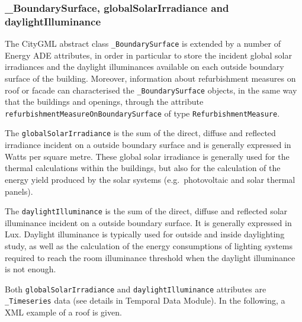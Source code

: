\documentclass[a4paper,12pt]{article}
\begin{document}
\subsubsection{\_BoundarySurface, globalSolarIrradiance and
daylightIlluminance}\label{boundarysurface-globalsolarirradiance-and-daylightilluminance}

The CityGML abstract class \texttt{\_BoundarySurface} is extended by a
number of Energy ADE attributes, in order in particular to store the
incident global solar irradiances and the daylight illuminances
available on each outside boundary surface of the building. Moreover,
information about refurbishment measures on roof or facade can
characterised the \texttt{\_BoundarySurface} objects, in the same way
that the buildings and openings, through the attribute
\texttt{refurbishmentMeasureOnBoundarySurface} of type
\texttt{RefurbishmentMeasure}.

The \texttt{globalSolarIrradiance} is the sum of the direct, diffuse and
reflected irradiance incident on a outside boundary surface and is
generally expressed in Watts per square metre. These global solar
irradiance is generally used for the thermal calculations within the
buildings, but also for the calculation of the energy yield produced by
the solar systems (e.g.~photovoltaic and solar thermal panels).

The \texttt{daylightIlluminance} is the sum of the direct, diffuse and
reflected solar illuminance incident on a outside boundary surface. It
is generally expressed in Lux. Daylight illuminance is typically used
for outside and inside daylighting study, as well as the calculation of
the energy consumptions of lighting systems required to reach the room
illuminance threshold when the daylight illuminance is not enough.

Both \texttt{globalSolarIrradiance} and \texttt{daylightIlluminance}
attributes are \texttt{\_Timeseries} data (see details in Temporal Data
Module). In the following, a XML example of a roof is given.
\end{document}
